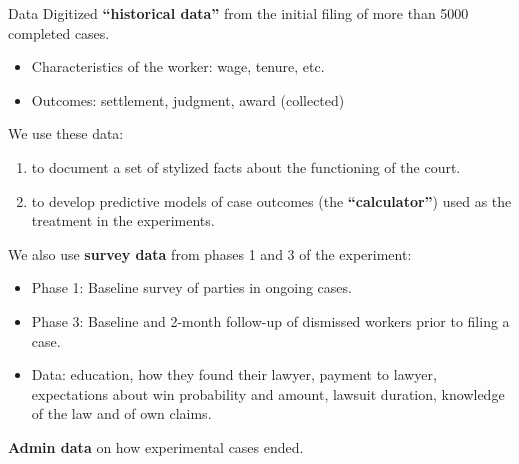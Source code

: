 \documentclass[9pt]{beamer}
\begin{document}
\begin{frame}{Data}
Digitized \textbf{``historical data''} from the initial filing of more than 5000 completed cases.
\vspace{2mm}
        \begin{itemize}
            \item Characteristics of the worker: wage, tenure, etc.
            \item Outcomes: settlement, judgment, award (collected)
        \end{itemize}
        \pause
    \vspace{2mm}
    We use these data:
    \begin{enumerate}
        \item to document a set of stylized facts about the functioning of the court.
        \item to develop predictive models of case outcomes (the \textbf{``calculator''}) used as the treatment in the experiments.
    \end{enumerate} 
\pause
\vspace{2mm}
We also use \textbf{survey data} from phases 1 and 3 of the experiment:
            \begin{itemize}
                \item Phase 1: Baseline survey of parties in ongoing cases.
                \item Phase 3: Baseline and 2-month follow-up of dismissed workers prior to filing a case.
                \item Data: education, how they found their lawyer, payment to lawyer, expectations about win probability and amount, lawsuit duration, knowledge of the law and of own claims.
                
            \end{itemize}
            
           \vspace{.1in}
            \textbf{Admin data} on how experimental cases ended.
            
  

\end{frame}
\end{document}
